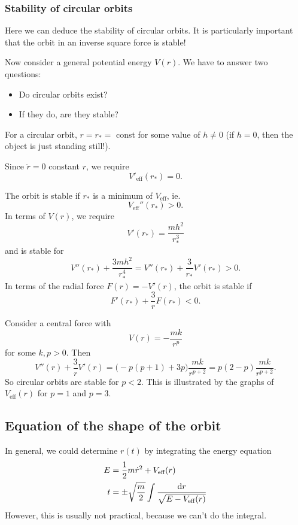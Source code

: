 \documentclass[a4paper]{article}
\begin{document}
\subsubsection{Stability of circular orbits}
Here we can deduce the stability of circular orbits. It is particularly important that the orbit in an inverse square force is stable!

Now consider a general potential energy $V(r)$. We have to answer two questions:
\begin{itemize}
  \item Do circular orbits exist?
  \item If they do, are they stable?
\end{itemize}

For a circular orbit, $r = r_* =$ const for some value of $h\not= 0$ (if $h = 0$, then the object is just standing still!).

Since $\ddot{r} = 0$ constant $r$, we require
\[
  V'_{\text{eff}}(r_*) = 0.
\]

The orbit is stable if $r_*$ is a minimum of $V_{\text{eff}}$, ie.
\[
  V_{\text{eff}}''(r_*) > 0.
\]
In terms of $V(r)$, we require
\[
  V'(r_*) = \frac{mh^2}{r_*^3}
\]
and is stable for
\[
  V''(r_*) + \frac{3mh^2}{r_*^4} = V''(r_*) + \frac{3}{r_*}V'(r_*) > 0.
\]
In terms of the radial force $F(r) = -V'(r)$, the orbit is stable if
\[
  F'(r_*) + \frac{3}{r}F(r_*) < 0.
\]
\begin{eg}
  Consider a central force with
  \[
    V(r) = -\frac{mk}{r^p}
  \]
  for some $k, p > 0$. Then
  \[
    V''(r) + \frac{3}{r}V'(r) = \big( -p(p + 1) + 3p\big)\frac{mk}{r^{p + 2}} = p(2-p)\frac{mk}{r^{p + 2}}.
  \]
  So circular orbits are stable for $p < 2$. This is illustrated by the graphs of $V_{\text{eff}}(r)$ for $p = 1$ and $p = 3$. 
  \begin{center}
  \end{center}
\end{eg}

\subsection{Equation of the shape of the orbit}
In general, we could determine $r(t)$ by integrating the energy equation
\begin{align*}
  E &= \frac{1}{2}m\dot{r}^2 + V_{\text{eff}}(r)\\
  t &= \pm \sqrt{\frac{m}{2}}\int \frac{\mathrm{d} r}{\sqrt{E - V_{\text{eff}}(r)}}
\end{align*}
However, this is usually not practical, because we can't do the integral.
\end{document}
